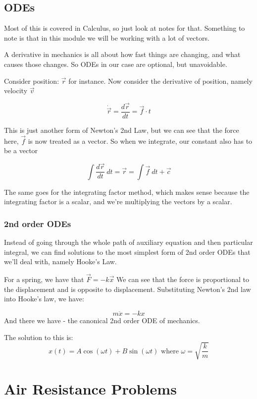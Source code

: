 \section{ODEs}

Most of this is covered in Calculus, so just look at notes for that. Something to note is that in this module we will be working with a lot of vectors. 

A derivative in mechanics is all about how fast things are changing, and what causes those changes. So ODEs in our case are optional, but unavoidable. 

Consider position: $\vec{r}$ for instance. Now consider the derivative of position, namely velocity $\vec{v}$ 

$$
\dot{\vec{r}} = \frac{d\vec{r}}{dt} = \vec{f}  \cdot t 
$$

This is just another form of Newton's 2nd Law, but we can see that the force here, $\vec{f}$ is now treated as a vector. So when we integrate, our constant also has to be a vector 

$$
\int \frac{d\vec{r}}{dt} \ dt = \vec{r} = \int \vec{f} \ dt + \vec{c}
$$

The same goes for the integrating factor method, which makes sense because the integrating factor is a scalar, and we're multiplying the vectors by a scalar. 


\subsection{2nd order ODEs}

Instead of going through the whole path of auxiliary equation and then particular integral, we can find solutions to the most simplest form of 2nd order ODEs that we'll deal with, namely Hooke's Law.  

For a spring, we have that $\vec{F} = - k \vec{x}$ 
We can see that the force is proportional to the displacement and is opposite to displacement. Substituting Newton's 2nd law into Hooke's law, we have: 

$$
m \ddot{x} = - k x 
$$
And there we have - the canonical 2nd order ODE of mechanics. 

The solution to this is: 
$$
x(t) = A \cos (\omega t) + B \sin (\omega t) \text{ where } \omega = \sqrt{\frac{k}{m}}
$$


\chapter{Air Resistance Problems}

